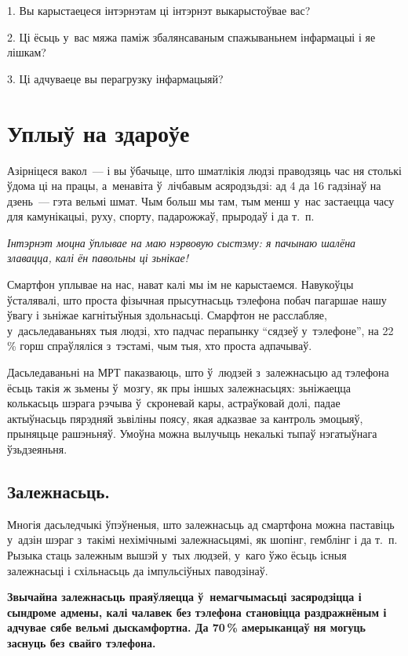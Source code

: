 1. Вы карыстаецеся інтэрнэтам ці інтэрнэт выкарыстоўвае вас?

2. Ці ёсьць у~вас мяжа паміж збалянсаваным спажываньнем інфармацыі і яе лішкам?

3. Ці адчуваеце вы перагрузку інфармацыяй?


\section{Уплыў на здароўе}

Азірніцеся вакол~--- і вы ўбачыце, што шматлікія людзі праводзяць час ня столькі ўдома ці на працы, а~менавіта ў~лічбавым асяродзьдзі: ад 4 да 16 гадзінаў на дзень~--- гэта вельмі шмат. Чым больш мы там, тым менш у~нас застаецца часу для камунікацыі, руху, спорту, падарожжаў, прыродаў і да т.~п.

\emph{Інтэрнэт моцна ўплывае на маю нэрвовую сыстэму: я пачынаю шалёна злавацца, калі ён павольны ці зьнікае!}

Смартфон уплывае на нас, нават калі мы ім не карыстаемся. Навукоўцы ўсталявалі, што проста фізычная прысутнасьць тэлефона побач пагаршае нашу ўвагу і зьніжае кагнітыўныя здольнасьці. Смарфтон не расслабляе, у~дасьледаваньнях тыя людзі, хто падчас перапынку ``сядзеў у~тэлефоне'', на 22\,\% горш спраўляліся з~тэстамі, чым тыя, хто проста адпачываў.

Дасьледаваньні на МРТ паказваюць, што ў~людзей з~залежнасьцю ад тэлефона ёсьць такія ж зьмены ў~мозгу, як пры іншых залежнасьцях: зьніжаецца колькасьць шэрага рэчыва ў~скроневай кары, астраўковай долі, падае актыўнасьць пярэдняй зьвіліны поясу, якая адказвае за кантроль эмоцыяў, прыняцьце рашэньняў. Умоўна можна вылучыць некалькі тыпаў нэгатыўнага ўзьдзеяньня.

\subsection*{Залежнасьць.}

Многія дасьледчыкі ўпэўненыя, што залежнасьць ад смартфона можна паставіць у~адзін шэраг з~такімі нехімічнымі залежнасьцямі, як шопінг, гемблінг і да т.~п. Рызыка стаць залежным вышэй у~тых людзей, у~каго ўжо ёсьць існыя залежнасьці і схільнасьць да імпульсіўных паводзінаў.

\textbf{Звычайна залежнасьць праяўляецца ў~немагчымасьці засяродзіцца і сындроме адмены, калі чалавек без тэлефона становіцца раздражнёным і адчувае сябе вельмі дыскамфортна. Да 70\,\% амерыканцаў ня могуць заснуць без свайго тэлефона.} 

